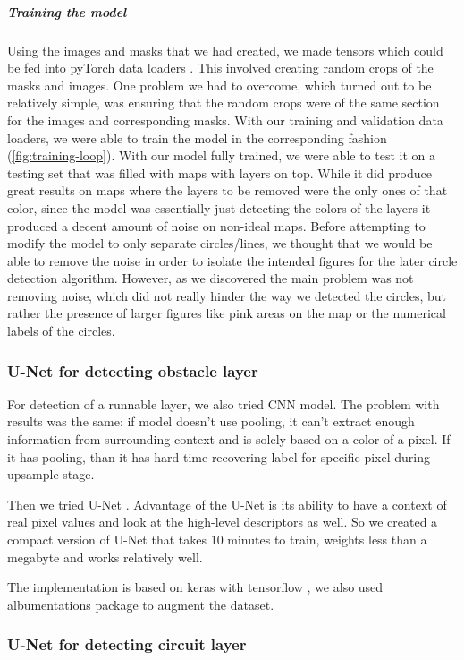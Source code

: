 \documentclass[a4paper,12pt]{extarticle}
\begin{document}
\subparagraph{Training the model\\}
Using the images and masks that we had created, we made tensors which could be fed into pyTorch data loaders \cite{pytorch}.
This involved creating random crops of the masks and images. One problem we had to overcome, which turned out to be relatively simple, was ensuring that the random crops were of the same section for the images and corresponding masks. With our training and validation data loaders, we were able to train the model in the corresponding fashion (\cref{fig:training-loop}). With our model fully trained, we were able to test it on a testing set that was filled with maps with layers on top. While it did produce great results on maps where the layers to be removed were the only ones of that color, since the model was essentially just detecting the colors of the layers it produced a decent amount of noise on non-ideal maps. Before attempting to modify the model to only separate circles/lines, we thought that we would be able to remove the noise in order to isolate the intended figures for the later circle detection algorithm. However, as we discovered the main problem was not removing noise, which did not really hinder the way we detected the circles, but rather the presence of larger figures like pink areas on the map or the numerical labels of the circles. 

\subsubsection{U-Net for detecting obstacle layer}

For detection of a runnable layer, we also tried CNN model.
The problem with results was the same: if model doesn't use pooling, it can't extract enough information from surrounding context and is solely based on a color of a pixel.
If it has pooling, than it has hard time recovering label for specific pixel during upsample stage.

Then we tried U-Net \cite{unet}. Advantage of the U-Net is its ability to have a context of real pixel values and look at the high-level descriptors as well.
So we created a compact version of U-Net that takes 10 minutes to train, weights less than a megabyte and works relatively well.

The implementation is based on keras with tensorflow \cite{keras}, we also used albumentations \cite{albumentations} package to augment the dataset.

\subsubsection{U-Net for detecting circuit layer}
\end{document}
